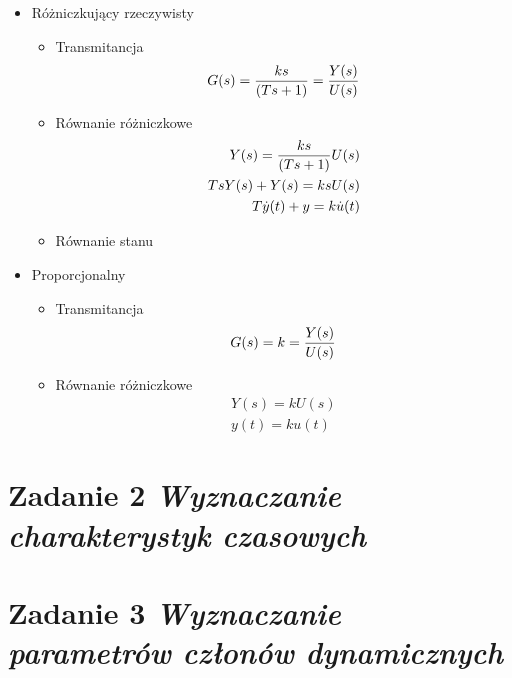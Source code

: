 \documentclass[a4paper,10pt]{article}
\begin{document}
\begin{itemize}
\item Różniczkujący rzeczywisty
\begin{itemize}
\item Transmitancja
	\begin{eqnarray}
		G(s)= {ks \over \left({Ts + 1}\right)} = {Y(s) \over U(s)}
	\end{eqnarray}
\item Równanie różniczkowe
	\begin{eqnarray}
		Y(s) = {ks \over \left({Ts + 1}\right)}  U(s)\\
		\nonumber TsY(s)+Y(s)=k s U(s)\\
		\nonumber T\dot{y}(t)+y=k\dot{u}(t)
	\end{eqnarray}
\item Równanie stanu
\end{itemize}

\item Proporcjonalny
\begin{itemize}
\item Transmitancja	
	\begin{eqnarray}
		G(s)= {k}= {Y(s) \over U(s)}
	\end{eqnarray}
\item Równanie różniczkowe
	\begin{eqnarray} 
		\nonumber Y(s) = k U(s)\\ \label{eq:prop_rozn}
		y(t)= ku(t)
	\end{eqnarray}
\end{itemize}

\end{itemize}

\section{Zadanie 2 \textit{\small Wyznaczanie charakterystyk czasowych}}\label{sec:zad2}

\section{Zadanie 3 \textit{\small Wyznaczanie parametrów członów dynamicznych}}\label{sec:zad3}
\end{document}
